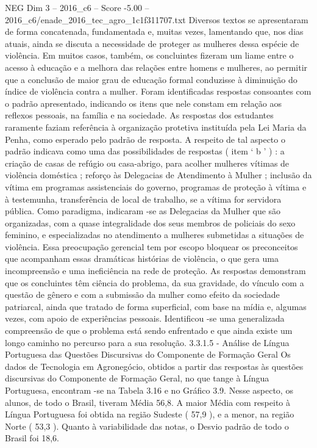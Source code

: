 \begin{textsample}{NEG Dim 3 – 2016\_c6 – Score -5.00 – 2016\_c6/enade\_2016\_tec\_agro\_1c1f311707.txt}
Diversos textos se apresentaram de forma concatenada, fundamentada e, muitas vezes, lamentando que, nos dias atuais, ainda se discuta a necessidade de proteger as mulheres dessa espécie de violência.
Em muitos casos, também, os concluintes fizeram um liame entre o acesso à educação e a melhora das relações entre homens e mulheres, ao permitir que a conclusão de maior grau de educação formal conduzisse à diminuição do índice de violência contra a mulher.
Foram identificadas respostas consoantes com o padrão apresentado, indicando os itens que nele constam em relação aos reflexos pessoais, na família e na sociedade.
As respostas dos estudantes raramente faziam referência à organização protetiva instituída pela Lei Maria da Penha, como esperado pelo padrão de resposta.
A respeito de tal aspecto o padrão indicava como uma das possibilidades de respostas ( item ‘ b ’ ) : a criação de casas de refúgio ou casa-abrigo, para acolher mulheres vítimas de violência doméstica ; reforço às Delegacias de Atendimento à Mulher ; inclusão da vítima em programas assistenciais do governo, programas de proteção à vítima e à testemunha, transferência de local de trabalho, se a vítima for servidora pública.
Como paradigma, indicaram -se as Delegacias da Mulher que são organizadas, com a quase integralidade dos seus membros de policiais do sexo feminino, e especializadas no atendimento a mulheres submetidas a situações de violência.
Essa preocupação gerencial tem por escopo bloquear os preconceitos que acompanham essas dramáticas histórias de violência, o que gera uma incompreensão e uma ineficiência na rede de proteção.
As respostas demonstram que os concluintes têm ciência do problema, da sua gravidade, do vínculo com a questão de gênero e com a submissão da mulher como efeito da sociedade patriarcal, ainda que tratado de forma superficial, com base na mídia e, algumas vezes, com apoio de experiências pessoais.
Identificou -se uma generalizada compreensão de que o problema está sendo enfrentado e que ainda existe um longo caminho no percurso para a sua resolução. 3.3.1.5 - Análise de Língua Portuguesa das Questões Discursivas do Componente de Formação Geral Os dados de Tecnologia em Agronegócio, obtidos a partir das respostas às questões discursivas do Componente de Formação Geral, no que tange à Língua Portuguesa, encontram -se na Tabela 3.16 e no Gráfico 3.9.
Nesse aspecto, os alunos, de todo o Brasil, tiveram Média 56,8.
A maior Média com respeito à Língua Portuguesa foi obtida na região Sudeste ( 57,9 ), e a menor, na região Norte ( 53,3 ).
Quanto à variabilidade das notas, o Desvio padrão de todo o Brasil foi 18,6.

\end{textsample}
